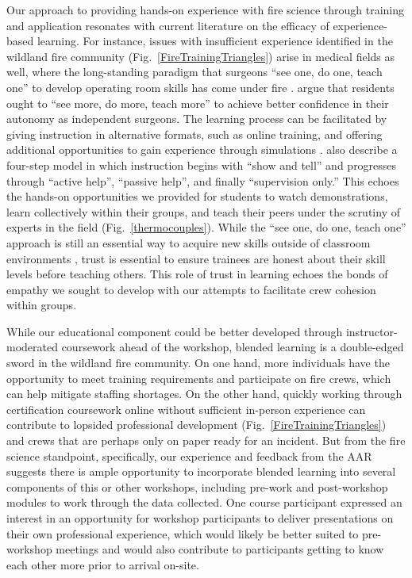 \documentclass[fire,article,submit,moreauthors,pdftex]{Definitions/mdpi}
\begin{document}
Our approach to providing hands-on experience with fire science through training and application resonates with current literature on the efficacy of experience-based learning. 
For instance, issues with insufficient experience identified in the wildland fire community (Fig.~\ref{FireTrainingTriangles}) arise in medical fields as well, where the long-standing paradigm that surgeons ``see one, do one, teach one'' to develop operating room skills has come under fire \citep{zahiri2015}.
\citet{hashimoto2016} argue that residents ought to ``see more, do more, teach more'' to achieve better confidence in their autonomy as independent surgeons. 
The learning process can be facilitated by giving instruction in alternative formats, such as online training, and offering additional opportunities to gain experience through simulations \citep{zahiri2015}.
\citet{george2014} also describe a four-step model in which instruction begins with ``show and tell'' and progresses through ``active help'', ``passive help'', and finally ``supervision only.'' 
This echoes the hands-on opportunities we provided for students to watch demonstrations, learn collectively within their groups, and teach their peers under the scrutiny of experts in the field (Fig.~\ref{thermocouples}). 
While the ``see one, do one, teach one'' approach is still an essential way to acquire new skills outside of classroom environments \citep{ayub2022}, trust is essential to ensure trainees are honest about their skill levels before teaching others. 
This role of trust in learning echoes the bonds of empathy \citep{park2020} we sought to develop with our attempts to facilitate crew cohesion within groups. 
 
While our educational component could be better developed through instructor-moderated coursework ahead of the workshop, blended learning is a double-edged sword in the wildland fire community.
On one hand, more individuals have the opportunity to meet training requirements and participate on fire crews, which can help mitigate staffing shortages.
On the other hand, quickly working through certification coursework online without sufficient in-person experience can contribute to lopsided professional development (Fig.~\ref{FireTrainingTriangles}) and crews that are perhaps only on paper ready for an incident.
But from the fire science standpoint, specifically, our experience and feedback from the AAR suggests there is ample opportunity to incorporate blended learning into several components of this or other workshops, including pre-work and post-workshop modules to work through the data collected.
One course participant expressed an interest in an opportunity for workshop participants to deliver presentations on their own professional experience, which would likely be better suited to pre-workshop meetings and would also contribute to participants getting to know each other more prior to arrival on-site.
\end{document}
